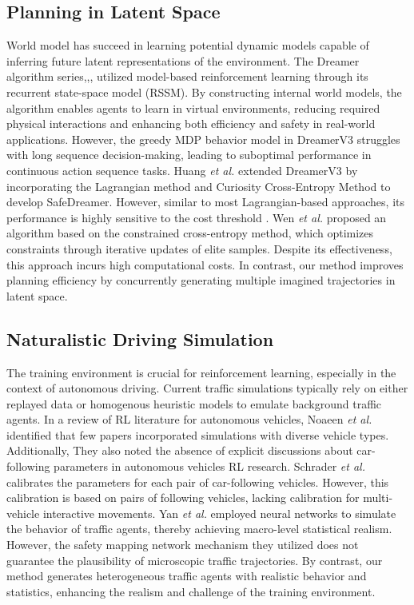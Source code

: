 \subsection{Planning in Latent Space}
World model\cite{ha2018world} has succeed in learning potential dynamic models capable of inferring future latent representations of the environment. The Dreamer algorithm series\cite{dreamer},\cite{dreamerv2},\cite{dreamerv3}, utilized model-based reinforcement learning through its recurrent state-space model (RSSM)\cite{RSSM}. By constructing internal world models, the algorithm enables agents to learn in virtual environments, reducing required physical interactions and enhancing both efficiency and safety in real-world applications. However, the greedy MDP behavior model in DreamerV3 struggles with long sequence decision-making, leading to suboptimal performance in continuous action sequence tasks.
Huang \textit{et al.} extended DreamerV3\cite{dreamerv3} by incorporating the Lagrangian method and Curiosity Cross-Entropy Method\cite{CCEM} to develop SafeDreamer\cite{safedreamer}. However, similar to most Lagrangian-based approaches, its performance is highly sensitive to the cost threshold \cite{gao2024enhance}. Wen \textit{et al.} \cite{CCEPETS} proposed an algorithm based on the constrained cross-entropy method, which optimizes constraints through iterative updates of elite samples. Despite its effectiveness, this approach incurs high computational costs. In contrast, our method improves planning efficiency by concurrently generating multiple imagined trajectories in latent space.
\subsection{Naturalistic Driving Simulation}
The training environment is crucial for reinforcement learning, especially in the context of autonomous driving. Current traffic simulations typically rely on either replayed data or homogenous heuristic models to emulate background traffic agents.
In a review of RL literature for autonomous vehicles, Noaeen \textit{et al.}\cite{noaeen2022reinforcement} identified that few papers incorporated simulations with diverse vehicle types. Additionally, They also noted the absence of explicit discussions about car-following parameters in autonomous vehicles RL research. Schrader \textit{et al.}\cite{sumoclibration} calibrates the parameters for each pair of car-following vehicles. However, this calibration is based on pairs of following vehicles, lacking calibration for multi-vehicle interactive movements. Yan \textit{et al.}\cite{NDE} employed neural networks to simulate the behavior of traffic agents, thereby achieving macro-level statistical realism. However, the safety mapping network mechanism they utilized does not guarantee the plausibility of microscopic traffic trajectories. 
By contrast, our method generates heterogeneous traffic agents with realistic behavior and statistics, enhancing the realism and challenge of the training environment. 
